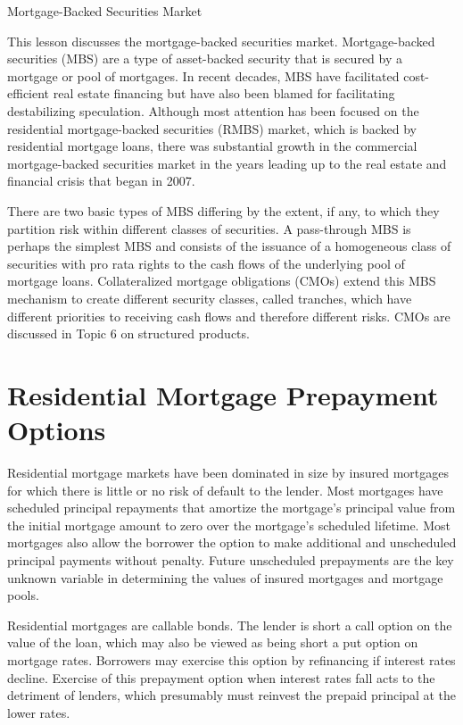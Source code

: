 \documentclass[11pt]{article}
\begin{document}
Mortgage-Backed Securities Market

This lesson discusses the mortgage-backed securities market. Mortgage-backed securities (MBS) are a type of asset-backed security that is secured by a mortgage or pool of mortgages. In recent decades, MBS have facilitated cost-efficient real estate financing but have also been blamed for facilitating destabilizing speculation. Although most attention has been focused on the residential mortgage-backed securities (RMBS) market, which is backed by residential mortgage loans, there was substantial growth in the commercial mortgage-backed securities market in the years leading up to the real estate and financial crisis that began in 2007.

There are two basic types of MBS differing by the extent, if any, to which they partition risk within different classes of securities. A pass-through MBS is perhaps the simplest MBS and consists of the issuance of a homogeneous class of securities with pro rata rights to the cash flows of the underlying pool of mortgage loans. Collateralized mortgage obligations (CMOs) extend this MBS mechanism to create different security classes, called tranches, which have different priorities to receiving cash flows and therefore different risks. CMOs are discussed in Topic 6 on structured products.

\section*{Residential Mortgage Prepayment Options}
Residential mortgage markets have been dominated in size by insured mortgages for which there is little or no risk of default to the lender. Most mortgages have scheduled principal repayments that amortize the mortgage's principal value from the initial mortgage amount to zero over the mortgage's scheduled lifetime. Most mortgages also allow the borrower the option to make additional and unscheduled principal payments without penalty. Future unscheduled prepayments are the key unknown variable in determining the values of insured mortgages and mortgage pools.

Residential mortgages are callable bonds. The lender is short a call option on the value of the loan, which may also be viewed as being short a put option on mortgage rates. Borrowers may exercise this option by refinancing if interest rates decline. Exercise of this prepayment option when interest rates fall acts to the detriment of lenders, which presumably must reinvest the prepaid principal at the lower rates.
\end{document}
